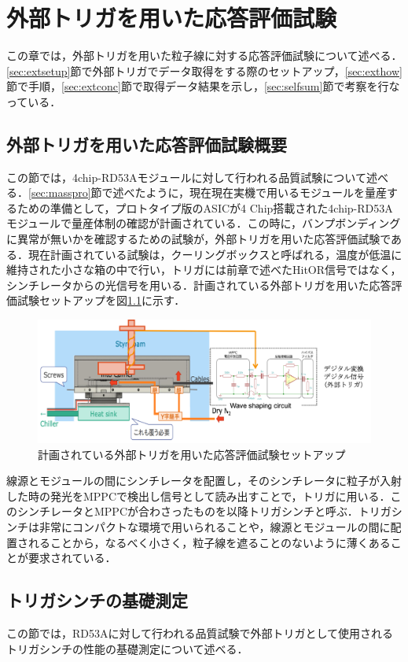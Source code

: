 \chapter{外部トリガを用いた応答評価試験}
この章では，外部トリガを用いた粒子線に対する応答評価試験について述べる．\ref{sec:extsetup}節で外部トリガでデータ取得をする際のセットアップ，\ref{sec:exthow}節で手順，\ref{sec:extconc}節で取得データ結果を示し，\ref{sec:selfsum}節で考察を行なっている．

\section{外部トリガを用いた応答評価試験概要}
この節では，4chip-RD53Aモジュールに対して行われる品質試験について述べる．\ref{sec:masspro}節で述べたように，現在現在実機で用いるモジュールを量産するための準備として，プロトタイプ版のASICが4 $\mathrm{Chip}$搭載された4chip-RD53Aモジュールで量産体制の確認が計画されている．この時に，バンプボンディングに異常が無いかを確認するための試験が，外部トリガを用いた応答評価試験である．現在計画されている試験は，クーリングボックスと呼ばれる，温度が低温に維持された小さな箱の中で行い，トリガには前章で述べたHitOR信号ではなく，シンチレータからの光信号を用いる．計画されている外部トリガを用いた応答評価試験セットアップを図\ref{fig:trigplan}に示す．

\begin{figure}[h]
  \centering
  \includegraphics[width=12cm]{./figure/trigplan.png}
  \caption{計画されている外部トリガを用いた応答評価試験セットアップ}
  \label{fig:trigplan}
\end{figure}

線源とモジュールの間にシンチレータを配置し，そのシンチレータに粒子が入射した時の発光をMPPCで検出し信号として読み出すことで，トリガに用いる．このシンチレータとMPPCが合わさったものを以降トリガシンチと呼ぶ．トリガシンチは非常にコンパクトな環境で用いられることや，線源とモジュールの間に配置されることから，なるべく小さく，粒子線を遮ることのないように薄くあることが要求されている．

\section{トリガシンチの基礎測定}
この節では，RD53Aに対して行われる品質試験で外部トリガとして使用されるトリガシンチの性能の基礎測定について述べる．

